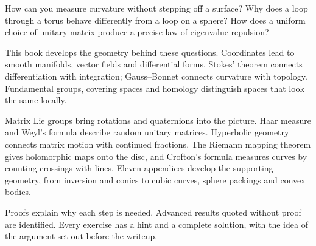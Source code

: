 How can you measure curvature without stepping off a surface? Why does a
loop through a torus behave differently from a loop on a sphere? How does
a uniform choice of unitary matrix produce a precise law of eigenvalue
repulsion?

This book develops the geometry behind these questions. Coordinates lead
to smooth manifolds, vector fields and differential forms. Stokes' theorem
connects differentiation with integration; Gauss--Bonnet connects curvature
with topology. Fundamental groups, covering spaces and homology distinguish
spaces that look the same locally.

Matrix Lie groups bring rotations and quaternions into the picture.
Haar measure and Weyl's formula describe random unitary matrices.
Hyperbolic geometry connects matrix motion with continued fractions.
The Riemann mapping theorem gives holomorphic maps onto the disc, and
Crofton's formula measures curves by counting crossings with lines.
Eleven appendices develop the supporting geometry, from inversion and
conics to cubic curves, sphere packings and convex bodies.

Proofs explain why each step is needed. Advanced results quoted without
proof are identified. Every exercise has a hint and a complete solution,
with the idea of the argument set out before the writeup.
